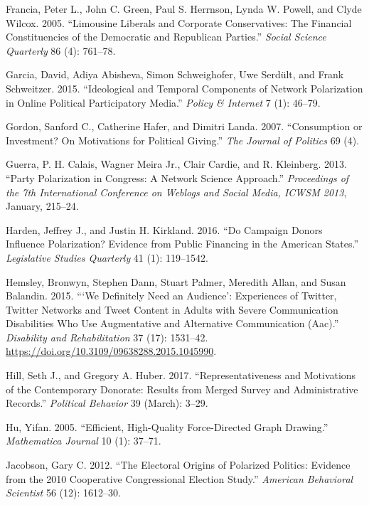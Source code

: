 \documentclass[12pt,]{article}
\begin{document}
\leavevmode\hypertarget{ref-francia2005}{}%
Francia, Peter L., John C. Green, Paul S. Herrnson, Lynda W. Powell, and
Clyde Wilcox. 2005. ``Limousine Liberals and Corporate Conservatives:
The Financial Constituencies of the Democratic and Republican Parties.''
\emph{Social Science Quarterly} 86 (4): 761--78.

\leavevmode\hypertarget{ref-garcia2015}{}%
Garcia, David, Adiya Abisheva, Simon Schweighofer, Uwe Serdült, and
Frank Schweitzer. 2015. ``Ideological and Temporal Components of Network
Polarization in Online Political Participatory Media.'' \emph{Policy \&
Internet} 7 (1): 46--79.

\leavevmode\hypertarget{ref-gordon2007}{}%
Gordon, Sanford C., Catherine Hafer, and Dimitri Landa. 2007.
``Consumption or Investment? On Motivations for Political Giving.''
\emph{The Journal of Politics} 69 (4).

\leavevmode\hypertarget{ref-guerra2013}{}%
Guerra, P. H. Calais, Wagner Meira Jr., Clair Cardie, and R. Kleinberg.
2013. ``Party Polarization in Congress: A Network Science Approach.''
\emph{Proceedings of the 7th International Conference on Weblogs and
Social Media, ICWSM 2013}, January, 215--24.

\leavevmode\hypertarget{ref-harden2016}{}%
Harden, Jeffrey J., and Justin H. Kirkland. 2016. ``Do Campaign Donors
Influence Polarization? Evidence from Public Financing in the American
States.'' \emph{Legislative Studies Quarterly} 41 (1): 119--1542.

\leavevmode\hypertarget{ref-hemsley2015}{}%
Hemsley, Bronwyn, Stephen Dann, Stuart Palmer, Meredith Allan, and Susan
Balandin. 2015. ```We Definitely Need an Audience': Experiences of
Twitter, Twitter Networks and Tweet Content in Adults with Severe
Communication Disabilities Who Use Augmentative and Alternative
Communication (Aac).'' \emph{Disability and Rehabilitation} 37 (17):
1531--42. \url{https://doi.org/10.3109/09638288.2015.1045990}.

\leavevmode\hypertarget{ref-hill2017}{}%
Hill, Seth J., and Gregory A. Huber. 2017. ``Representativeness and
Motivations of the Contemporary Donorate: Results from Merged Survey and
Administrative Records.'' \emph{Political Behavior} 39 (March): 3--29.

\leavevmode\hypertarget{ref-yifanhu}{}%
Hu, Yifan. 2005. ``Efficient, High-Quality Force-Directed Graph
Drawing.'' \emph{Mathematica Journal} 10 (1): 37--71.

\leavevmode\hypertarget{ref-jacobson2012}{}%
Jacobson, Gary C. 2012. ``The Electoral Origins of Polarized Politics:
Evidence from the 2010 Cooperative Congressional Election Study.''
\emph{American Behavioral Scientist} 56 (12): 1612--30.
\end{document}
